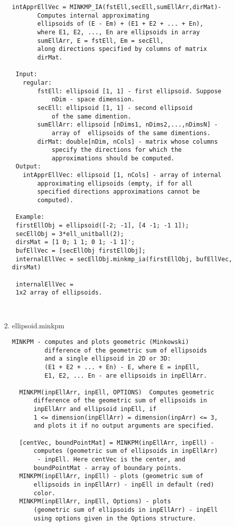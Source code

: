 \begin{enumerate}
\begin{lstlisting}
intApprEllVec = MINKMP_IA(fstEll,secEll,sumEllArr,dirMat)-
       Computes internal approximating
       ellipsoids of (E - Em) + (E1 + E2 + ... + En),
       where E1, E2, ..., En are ellipsoids in array
       sumEllArr, E = fstEll, Em = secEll,
       along directions specified by columns of matrix
       dirMat.

 Input:
   regular:
       fstEll: ellipsoid [1, 1] - first ellipsoid. Suppose
           nDim - space dimension.
       secEll: ellipsoid [1, 1] - second ellipsoid
           of the same dimention.
       sumEllArr: ellipsoid [nDims1, nDims2,...,nDimsN] -
           array of  ellipsoids of the same dimentions.
       dirMat: double[nDim, nCols] - matrix whose columns
           specify the directions for which the
           approximations should be computed.
 Output:
   intApprEllVec: ellipsoid [1, nCols] - array of internal
       approximating ellipsoids (empty, if for all
       specified directions approximations cannot be
       computed).

 Example:
 firstEllObj = ellipsoid([-2; -1], [4 -1; -1 1]);
 secEllObj = 3*ell_unitball(2);
 dirsMat = [1 0; 1 1; 0 1; -1 1]';
 bufEllVec = [secEllObj firstEllObj];
 internalEllVec = secEllObj.minkmp_ia(firstEllObj, bufEllVec, dirsMat)

 internalEllVec =
 1x2 array of ellipsoids.



\end{lstlisting}
\fontfamily{\familydefault}
\selectfont
\item {ellipsoid.minkpm}
\selectfont
\begin{lstlisting}
MINKPM - computes and plots geometric (Minkowski)
         difference of the geometric sum of ellipsoids
         and a single ellipsoid in 2D or 3D:
         (E1 + E2 + ... + En) - E, where E = inpEll,
         E1, E2, ... En - are ellipsoids in inpEllArr.

  MINKPM(inpEllArr, inpEll, OPTIONS)  Computes geometric
      difference of the geometric sum of ellipsoids in
      inpEllArr and ellipsoid inpEll, if
      1 <= dimension(inpEllArr) = dimension(inpArr) <= 3,
      and plots it if no output arguments are specified.

  [centVec, boundPointMat] = MINKPM(inpEllArr, inpEll) -
      computes (geometric sum of ellipsoids in inpEllArr)
       - inpEll. Here centVec is the center, and
      boundPointMat - array of boundary points.
  MINKPM(inpEllArr, inpEll) - plots (geometric sum of
      ellipsoids in inpEllArr) - inpEll in default (red)
      color.
  MINKPM(inpEllArr, inpEll, Options) - plots
      (geometric sum of ellipsoids in inpEllArr) - inpEll
      using options given in the Options structure.


\end{lstlisting}
\end{enumerate}
